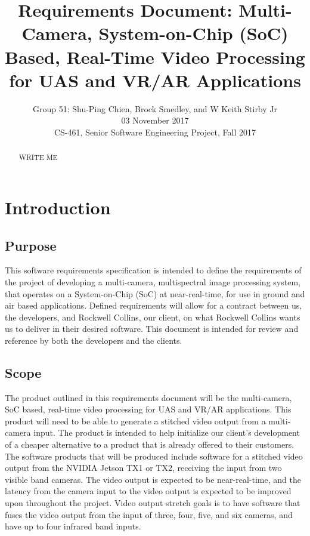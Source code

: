\documentclass[letterpaper,10pt,serif,draftclsnofoot,onecolumn,compsoc,titlepage]{IEEEtran}
\title{Requirements Document: Multi-Camera, System-on-Chip (SoC) Based, Real-Time Video Processing for UAS and VR/AR Applications}
\author{Group 51: Shu-Ping Chien, Brock Smedley, and W Keith Stirby Jr \\ 03 November 2017 \\ CS-461, Senior Software Engineering Project, Fall 2017}
\begin{document}
\begin{titlepage}
\maketitle
\begin{abstract}

WRITE ME \\

\end{abstract}
\end{titlepage}
\newpage

\tableofcontents
\newpage

\section{Introduction}

\subsection{Purpose}

This software requirements specification is intended to define the requirements of the 
project of developing a multi-camera, multispectral image processing system, that 
operates on a System-on-Chip (SoC) at near-real-time, for use in ground and air based 
applications. Defined requirements will allow for a contract between us, the 
developers, and Rockwell Collins, our client, on what Rockwell Collins wants us to 
deliver in their desired software. This document is intended for review and reference 
by both the developers and the clients.\\

\subsection{Scope}

The product outlined in this requirements document will be the multi-camera, SoC based,
 real-time video processing for UAS and VR/AR applications. This product will need to 
 be able to generate a stitched video output from a multi-camera input. The product is 
 intended to help initialize our client's development of a cheaper alternative to a 
 product that is already offered to their customers.\\

The software products that will be produced include software for a stitched video output 
from the NVIDIA Jetson TX1 or TX2, receiving the input from two visible band cameras. 
The video output is expected to be near-real-time, and the latency from the camera 
input to the video output is expected to be improved upon throughout the project. Video 
output stretch goals is to have software that fuses the video output from the input of 
three, four, five, and six cameras, and have up to four infrared band inputs.\\
\end{document}
